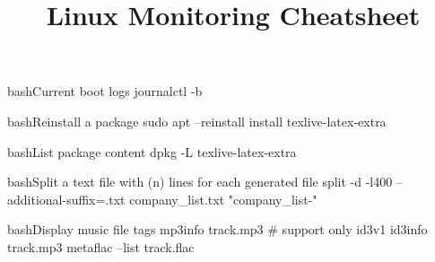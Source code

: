 \documentclass[10pt,a4paper]{article}
\title{\color{w3schools}Linux Monitoring Cheatsheet
}
\begin{document}
\maketitle

\small
\begin{multicols}{3}

\thispagestyle{empty}
\scriptsize



\begin{codebox}{bash}{Current boot logs}
journalctl -b

\end{codebox}

\begin{codebox}{bash}{Reinstall a package}
sudo apt --reinstall install texlive-latex-extra

\end{codebox}

\begin{codebox}{bash}{List package content}
dpkg -L texlive-latex-extra

\end{codebox}

\begin{codebox}{bash}{Split a text file with (n) lines for each generated file}
split  -d -l400 --additional-suffix=.txt company_list.txt "company_list-"

\end{codebox}

\begin{codebox}{bash}{Display music file tags}
mp3info track.mp3    # support only id3v1
id3info track.mp3    
metaflac --list track.flac

\end{codebox}


\AtNextBibliography{\footnotesize}
\printbibliography  
\end{multicols}
\end{document}
